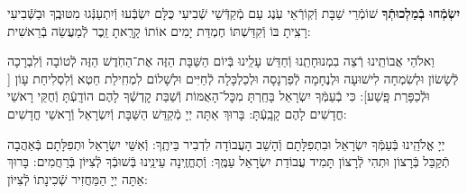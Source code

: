 \documentclass[twoside, openany, parskip=half, 11pt]{book}
\begin{document}
\begin{sometimes}
\textbf{יִשְׂמְֿחוּ בְֿמַלְכוּתְֿךָ}
 שׁוֹמְֿרֵי שַׁבָּת וְֿקֽוֹרְֿאֵי עֹֽנֶג עַם מְֿקַדְּֿשֵׁי שְֿׁבִיעִי כֻּלָּם יִשְׂבְּֿעוּ וְֿיִתְעַנְּֿגוּ מִטּוּבֶֽךָ וּבַשְּֿׁבִיעִי רָצִֽיתָ בּוֹ וְֿקִדַּשְׁתּוֹ חֶמְדַּת יָמִים אוֹתוֹ קָרָֽאתָ זֵֽכֶר לְֿמַעֲשֵׂה בְֿרֵאשִׁית:

 וֵאלֹהֵי אֲבוֹתֵֽינוּ רְֿצֵה בִמְנוּחָתֵֽנוּ וְֿחַדֵּשׁ עָלֵֽינוּ בְּֿיוֹם הַשַּׁבָּת הַזֶּה אֶת־הַחֹֽדֶשׁ הַזֶּה לְֿטוֹבָה וְֿלִבְרָכָה לְֿשָׂשׂוֹן וּלְשִׂמְחָה לִישׁוּעָה וּלְנֶחָמָה לְֿפַרְנָסָה וּלְכַלְכָּלָה לְֿחַיִּים וּלְשָׁלוֹם לִמְחִֽילַת חֵטְא וְֿלִסְלִיחַת עָוֹן [
וּלְֿכַפָּרַת פָּֽשַׁע]: כִּי בְֿעַמְּֿךָ יִשְׂרָאֵל בָּחַֽרְתָּ מִכׇּל־הָאֻמּוֹת וְֿשַׁבַּת קׇדְשְֿׁךָ לָהֶם הוֹדָֽעְֿתָּ וְֿחֻקֵּי רָאשֵׁי חֳדָשִׁים לָהֶם קָבָֽעְֿתָּ: בָּרוּךְ אַתָּה יְיָ מְֿקַדֵּשׁ הַשַּׁבָּת וְֿיִשְׂרָאֵל וְֿרָאשֵׁי חֳדָשִׁים: 

\end{sometimes}

 יְיָ אֱלֹהֵֽינוּ בְּֿעַמְּֿךָ יִשְׂרָאֵל וּבִתְפִלָּתָם וְֿהָשֵׁב הָעֲבוֹדָה לִדְבִיר בֵּיתֶֽךָ: וְֿאִשֵּׁי יִשְׂרָאֵל וּתְפִלָּתָם בְּֿאַהֲבָה תְֿקַבֵּל בְּֿרָצוֹן וּתְהִי לְֿרָצוֹן תָּמִיד עֲבוֹדַת יִשְׂרָאֵל עַמֶּֽךָ: וְֿתֶחֱזֶֽינָה עֵינֵֽינוּ בְּֿשׁוּבְֿךָ לְֿצִיּוֹן בְּֿרַחֲמִים:
בָּרוּךְ אַתָּה יְיָ הַמַּחֲזִיר שְֿׁכִינָתוֹ לְֿצִיּוֹן:

\modim

\shabboschanukah

\shabboshodos

\vspace{.5\baselineskip}

\shatzbrikaskohanim

\shabbossimshalom


\tachanunim

\fullkaddish
\end{document}

